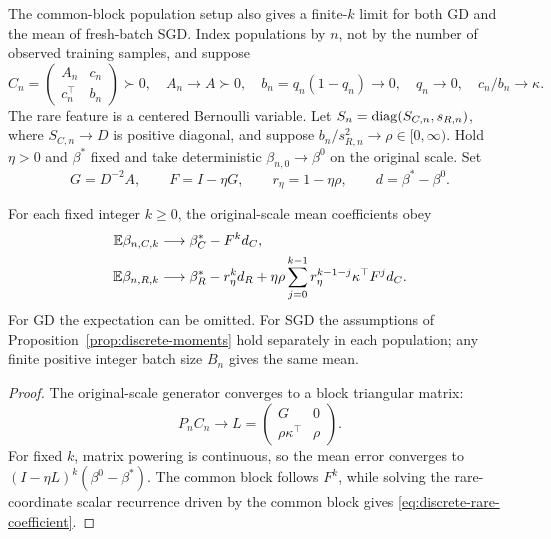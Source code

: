 The common-block population setup also gives a finite-$k$ limit for both GD and
the mean of fresh-batch SGD. Index populations by $n$, not by the number of
observed training samples, and suppose
\[
 C_n = \begin{pmatrix}
        A_n      & c_n \\
        c_n^\top & b_n
       \end{pmatrix}
     \succ 0,\quad A_n
     \to A
     \succ 0,\quad b_n
     = q_n(1 - q_n)
     \to 0,\quad q_n
     \to 0, \quad c_n/b_n
     \to \kappa.
\]
The rare feature is a centered Bernoulli variable. Let
$S_n = \operatorname{diag}(S_{C,n},s_{R,n})$, where $S_{C,n} \to D$ is positive diagonal, and
suppose $b_n/s_{R,n}^2 \to \rho \in [0,\infty)$. Hold $\eta > 0$ and $\beta^*$
fixed and take deterministic $\beta_{n,0} \to \beta^0$ on the original scale.
Set
\[
 G = D^{-2}A,\qquad F
   = I - \eta G,\qquad r_\eta
   = 1 - \eta\rho, \qquad d
   = \beta^* - \beta^0.
\]
\begin{proposition}
 \label{prop:discrete-rare}
 For each fixed integer $k \ge 0$, the original-scale mean coefficients obey
 \begin{align}
  \mathbb{E}\beta_{n,C,k} & \longrightarrow \beta_C^* - F^kd_C,\label{eq:discrete-rare-common}                                                                       \\
  \mathbb{E}\beta_{n,R,k} & \longrightarrow \beta_R^* - r_\eta^kd_R + \eta\rho\sum_{j=0}^{k-1}r_\eta^{k-1-j}\kappa^\top F^jd_C. \label{eq:discrete-rare-coefficient}
 \end{align}
 For GD the expectation can be omitted. For SGD the assumptions of
 Proposition~\ref{prop:discrete-moments} hold separately in each population; any
 finite positive integer batch size $B_n$ gives the same mean.
\end{proposition}
\begin{proof}
 The original-scale generator converges to a block triangular matrix:
 \[
  P_nC_n \longrightarrow L
         = \begin{pmatrix}
            G               & 0    \\
            \rho\kappa^\top & \rho
           \end{pmatrix}.
 \]
 For fixed $k$, matrix powering is continuous, so the mean error converges to
 $(I - \eta L)^k(\beta^0 - \beta^*)$. The common block follows $F^k$, while
 solving the rare-coordinate scalar recurrence driven by the common block gives
 \eqref{eq:discrete-rare-coefficient}.
\end{proof}

